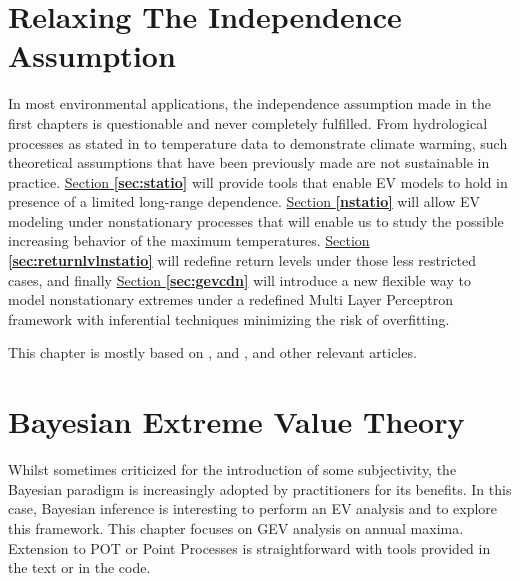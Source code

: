 \documentclass[11pt,a4paper,openany, twosided]{book}
\begin{document}
\newpage




\chapter{Relaxing The Independence Assumption}\label{sec::3}
\vspace{-1cm}
\minitoc\thispagestyle{empty}
 \vspace{1cm}
 
In most environmental applications, the independence assumption made in the first chapters is questionable and never completely fulfilled. From hydrological processes as stated in \citet{milly_climate_2008} to temperature data to demonstrate climate warming, such theoretical assumptions that have been previously made are not sustainable in practice. \hyperref[sec:statio]{Section \textbf{\ref{sec:statio}}} will provide tools that enable EV models to hold in presence of a limited long-range dependence.
\hyperref[nstatio]{Section \textbf{\ref{nstatio}}} will allow EV modeling under nonstationary processes that will enable us to study the possible increasing behavior of the maximum temperatures. \hyperref[sec:returnlvlnstatio]{Section \textbf{\ref{sec:returnlvlnstatio}}} will redefine return levels under those less restricted cases, and finally  \hyperref[sec:gevcdn]{Section \textbf{\ref{sec:gevcdn}}} will introduce a new flexible way to model nonstationary extremes under a redefined Multi Layer Perceptron framework with inferential techniques minimizing the risk of overfitting.


This chapter is mostly based on \citet[chap.5-6]{coles_introduction_2001}, \citet[chap.10]{beirlant_statistics_2006} and \citet[chap.7]{reiss_statistical_2007}, and other relevant articles.
\newpage





\chapter{Bayesian Extreme Value Theory}\label{sec::bayesian}
\vspace{-1.5cm}
\minitoc\thispagestyle{empty}
 \vspace{0.1cm}


Whilst sometimes criticized for the introduction of some subjectivity, the Bayesian paradigm is increasingly adopted by practitioners for its benefits. In this case, Bayesian inference is interesting to perform an EV analysis and to explore this framework. This chapter focuses on GEV analysis on annual maxima. Extension to POT or Point Processes is straightforward with tools provided in the text or in the code.
\end{document}
